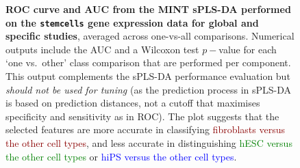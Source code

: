 \documentclass[]{book}
\begin{document}
\begin{figure}

{\centering {}

}

\caption{\textbf{ROC curve and AUC from the MINT sPLS-DA performed
on the \texttt{stemcells} gene expression data for global and specific
studies}, averaged across one-vs-all comparisons. Numerical outputs
include the AUC and a Wilcoxon test \(p-\)value for each `one vs.~other'
class comparison that are performed per component. This output
complements the sPLS-DA performance evaluation but \emph{should not be
used for tuning} (as the prediction process in sPLS-DA is based on
prediction distances, not a cutoff that maximises specificity and
sensitivity as in ROC). The plot suggests that the selected features are
more accurate in classifying
\textcolor{darkred}{fibroblasts versus the other cell types}, and less
accurate in distinguishing
\textcolor{green}{hESC versus the other cell types} or
\textcolor{blue}{hiPS versus the other cell types}.}\label{fig:MINT-auc}
\end{figure}
\end{document}
